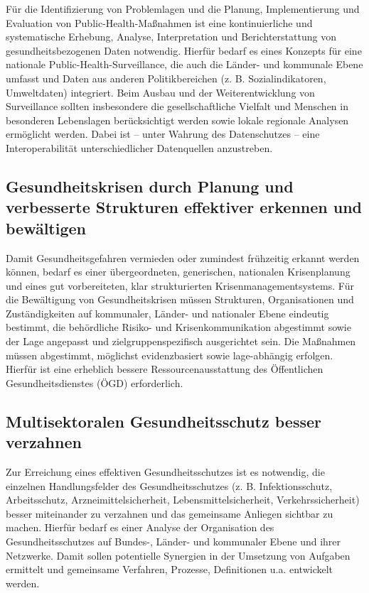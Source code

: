 \documentclass{article}
\begin{document}
Für die Identifizierung von Problemlagen und die Planung, Implementierung und Evaluation von Public-Health-Maßnahmen ist eine kontinuierliche und systematische Erhebung, Analyse, Interpretation und Berichterstattung von gesundheitsbezogenen Daten notwendig. Hierfür bedarf es eines Konzepts für eine nationale Public-Health-Surveillance, die auch die Länder- und kommunale Ebene umfasst und Daten aus anderen Politikbereichen (z. B. Sozialindikatoren, Umweltdaten) integriert. Beim Ausbau und der Weiterentwicklung von Surveillance sollten insbesondere die gesellschaftliche Vielfalt und Menschen in besonderen Lebenslagen berücksichtigt werden sowie lokale regionale Analysen ermöglicht werden. Dabei ist – unter Wahrung des Datenschutzes – eine Interoperabilität unterschiedlicher Datenquellen anzustreben.


\subsection{Gesundheitskrisen durch Planung und verbesserte Strukturen effektiver erkennen und bewältigen}\label{H3338860}



Damit Gesundheitsgefahren vermieden oder zumindest frühzeitig erkannt werden können, bedarf es einer übergeordneten, generischen, nationalen Krisenplanung und eines gut vorbereiteten, klar strukturierten Krisenmanagementsystems. Für die Bewältigung von Gesundheitskrisen müssen Strukturen, Organisationen und Zuständigkeiten auf kommunaler, Länder- und nationaler Ebene eindeutig bestimmt, die behördliche Risiko- und Krisenkommunikation abgestimmt sowie der Lage angepasst und zielgruppenspezifisch ausgerichtet sein. Die Maßnahmen müssen abgestimmt, möglichst evidenzbasiert sowie lage-abhängig erfolgen. Hierfür ist eine erheblich bessere Ressourcenausstattung des Öffentlichen Gesundheitsdienstes (ÖGD) erforderlich.


\subsection{Multisektoralen Gesundheitsschutz besser verzahnen}\label{H1257975}



Zur Erreichung eines effektiven Gesundheitsschutzes ist es notwendig, die einzelnen Handlungsfelder des Gesundheitsschutzes (z. B. Infektionsschutz, Arbeitsschutz, Arzneimittelsicherheit, Lebensmittelsicherheit, Verkehrssicherheit) besser miteinander zu verzahnen und das gemeinsame Anliegen sichtbar zu machen. Hierfür bedarf es einer Analyse der Organisation des Gesundheitsschutzes auf Bundes-, Länder- und kommunaler Ebene und ihrer Netzwerke. Damit sollen potentielle Synergien in der Umsetzung von Aufgaben ermittelt und gemeinsame Verfahren, Prozesse, Definitionen u.a. entwickelt werden.
\end{document}
